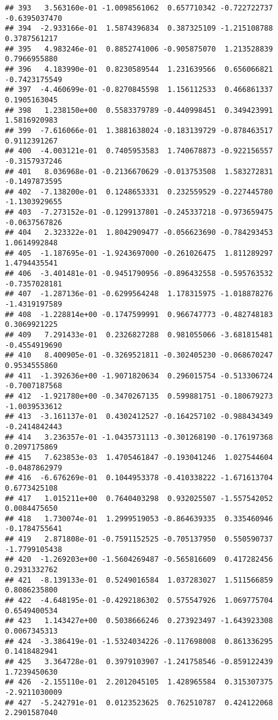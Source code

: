 \documentclass[
]{article}
\begin{document}
\begin{verbatim}
## 393   3.563160e-01 -1.0098561062  0.657710342 -0.722722737 -0.6395037470
## 394  -2.933166e-01  1.5874396834  0.387325109 -1.215108788  0.3787561217
## 395   4.983246e-01  0.8852741006 -0.905875070  1.213528839  0.7966955880
## 396   4.183990e-01  0.8230589544  1.231639566  0.656066821 -0.7423175549
## 397  -4.460699e-01 -0.8270845598  1.156112533  0.466861337  0.1905163045
## 398   1.238150e+00  0.5583379789 -0.440998451  0.349423991  1.5816920983
## 399  -7.616066e-01  1.3881638024 -0.183139729 -0.878463517  0.9112391267
## 400  -4.003121e-01  0.7405953583  1.740678873 -0.922156557 -0.3157937246
## 401   8.036968e-01 -0.2136670629 -0.013753508  1.583272831 -0.1497873595
## 402  -7.138200e-01  0.1248653331  0.232559529 -0.227445780 -1.1303929655
## 403  -7.273152e-01 -0.1299137801 -0.245337218 -0.973659475 -0.0637567826
## 404   2.323322e-01  1.8042909477 -0.056623690 -0.784293453  1.0614992848
## 405  -1.187695e-01 -1.9243697000 -0.261026475  1.811289297  1.4794435541
## 406  -3.401481e-01 -0.9451790956 -0.896432558 -0.595763532 -0.7357028181
## 407  -1.287136e-01 -0.6299564248  1.178315975 -1.018878276 -1.4319197589
## 408  -1.228814e+00 -0.1747599991  0.966747773 -0.482748183  0.3069921225
## 409   7.291433e-01  0.2326827288  0.981055066 -3.681815481 -0.4554919690
## 410   8.400905e-01 -0.3269521811 -0.302405230 -0.068670247  0.9534555860
## 411  -1.392636e+00 -1.9071820634  0.296015754 -0.513306724 -0.7007187568
## 412  -1.921780e+00 -0.3470267135  0.599881751 -0.180679273 -1.0039533612
## 413  -3.161137e-01  0.4302412527 -0.164257102 -0.988434349 -0.2414842443
## 414   3.236357e-01 -1.0435731113 -0.301268190 -0.176197368  0.2097175869
## 415   7.623853e-03  1.4705461847 -0.193041246  1.027544604 -0.0487862979
## 416  -6.676269e-01  0.1044953378 -0.410338222 -1.671613704  0.6773425108
## 417   1.015211e+00  0.7640403298  0.932025507 -1.557542052  0.0084475650
## 418   1.730074e-01  1.2999519053 -0.864639335  0.335460946 -0.1784755641
## 419   2.871808e-01 -0.7591152525 -0.705137950  0.550590737 -1.7799105438
## 420  -1.269203e+00 -1.5604269487 -0.565816609  0.417282456  0.2931332762
## 421  -8.139133e-01  0.5249016584  1.037283027  1.511566859  0.8086235800
## 422  -4.648195e-01 -0.4292186302  0.575547926  1.069775704  0.6549400534
## 423   1.143427e+00  0.5038666246  0.273923497 -1.643923308  0.0067345313
## 424  -3.386419e-01 -1.5324034226 -0.117698008  0.861336295  0.1418482941
## 425   3.364728e-01  0.3979103907 -1.241758546 -0.859122439  1.7239450630
## 426  -2.155110e-01  2.2012045105  1.428965584  0.315307375 -2.9211030009
## 427  -5.242791e-01  0.0123523625  0.762510787  0.424122068  2.2901587040

\end{verbatim}
\end{document}
